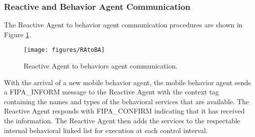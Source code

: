     \subsubsection{Reactive and Behavior Agent Communication}
      The Reactive Agent to behavior agent communication procedures are shown 
        in Figure \ref{fig:batora}.
      \begin{figure}%
        \centerline{\texttt{[image: figures/RAtoBA]}}
        \caption{Reactive Agent to behaviors agent communication.}
        \label{fig:batora}
      \end{figure}
      With the arrival of a new mobile behavior agent, the mobile behavior 
        agent sends a FIPA\_INFORM message to the Reactive Agent with the context 
        tag containing the names and types of the behavioral services that are 
        available.
      The Reactive Agent responds with FIPA\_CONFIRM indicating that it has 
        received the information.
      The Reactive Agent then adds the services to the respectable internal 
        behavioral linked list for execution at each control interval.

